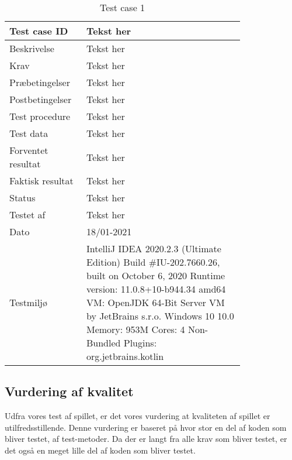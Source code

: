 \begin{table}[h]
    \centering
    \begin{tabular}{|p{0.20\linewidth} | p{0.6\linewidth}|}
    \hline
        Test case ID & Tekst her \\
        \hline
        Beskrivelse & Tekst her \\
        \hline
        Krav & Tekst her\\
        \hline
        Præbetingelser & Tekst her \\
        \hline
        Postbetingelser & Tekst her \\
        \hline
        Test procedure & Tekst her\\
        \hline
        Test data & Tekst her \\
        \hline
        Forventet resultat & Tekst her \\
        \hline
        Faktisk resultat & Tekst her \\
        \hline
        Status & Tekst her\\
        \hline
        Testet af & Tekst her \\
        \hline
        Dato & 18/01-2021 \\
        \hline
        Testmiljø & IntelliJ IDEA 2020.2.3 (Ultimate Edition)
Build \#IU-202.7660.26, built on October 6, 2020
Runtime version: 11.0.8+10-b944.34 amd64
VM: OpenJDK 64-Bit Server VM by JetBrains s.r.o.
Windows 10 10.0
Memory: 953M
Cores: 4
Non-Bundled Plugins: org.jetbrains.kotlin\\
        \hline
    \end{tabular}
    \caption{Test case 1}
    \label{tab:TC01}
\end{table}

\newpage

\subsection{Vurdering af kvalitet}
Udfra vores test af spillet, er det vores vurdering at kvaliteten af spillet er utilfredsstillende. 
\newline
Denne vurdering er baseret på hvor stor en del af koden som bliver testet, af test-metoder. Da der er langt fra alle krav som bliver testet, er det også en meget lille del af koden som bliver testet. 


